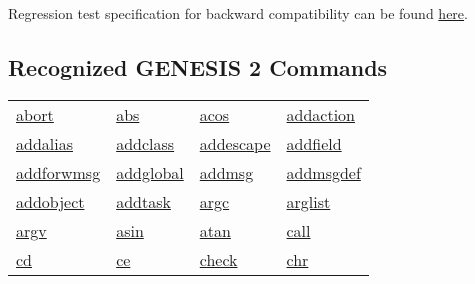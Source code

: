 \documentclass[12pt]{article}
\begin{document}
Regression test specification for backward compatibility can be found \href{http://neurospaces.sourceforge.net/neurospaces_project/ns-sli/tests/html/index.html}{here}.

\subsection*{Recognized GENESIS 2 Commands}

\begin{tabular}{l l l l}

\href{http://genesis-sim.org/GENESIS/Hyperdoc/Manual-25.html#ss25.1}{abort}                          & \href{http://genesis-sim.org/GENESIS/Hyperdoc/Manual-25.html#ss25.2}{abs}                        & \href{http://genesis-sim.org/GENESIS/Hyperdoc/Manual-25.html#ss25.3}{acos}              & \href{http://genesis-sim.org/GENESIS/Hyperdoc/Manual-25.html#ss25.4}{addaction}          \\
\href{http://genesis-sim.org/GENESIS/Hyperdoc/Manual-25.html#ss25.5}{addalias	}		& \href{http://genesis-sim.org/GENESIS/Hyperdoc/Manual-25.html#ss25.6}{addclass}		& \href{http://genesis-sim.org/GENESIS/Hyperdoc/Manual-25.html#ss25.7}{addescape}	& \href{http://genesis-sim.org/GENESIS/Hyperdoc/Manual-25.html#ss25.8}{addfield}		\\         
\href{http://genesis-sim.org/GENESIS/Hyperdoc/Manual-25.html#ss25.9}{addforwmsg}		& \href{http://genesis-sim.org/GENESIS/Hyperdoc/Manual-25.html#ss25.10}{addglobal}		& \href{http://genesis-sim.org/GENESIS/Hyperdoc/Manual-25.html#ss25.11}{addmsg} 	& \href{http://genesis-sim.org/GENESIS/Hyperdoc/Manual-25.html#ss25.12}{addmsgdef}	\\
\href{http://genesis-sim.org/GENESIS/Hyperdoc/Manual-25.html#ss25.13}{addobject}		& \href{http://genesis-sim.org/GENESIS/Hyperdoc/Manual-25.html#ss25.14}{addtask}		& \href{http://genesis-sim.org/GENESIS/Hyperdoc/Manual-25.html#ss25.15}{argc} 		& \href{http://genesis-sim.org/GENESIS/Hyperdoc/Manual-25.html#ss25.16}{arglist}		\\
\href{http://genesis-sim.org/GENESIS/Hyperdoc/Manual-25.html#ss25.17}{argv}			& \href{http://genesis-sim.org/GENESIS/Hyperdoc/Manual-25.html#ss25.19}{asin}			& \href{http://genesis-sim.org/GENESIS/Hyperdoc/Manual-25.html#ss25.20}{atan} 		& \href{http://genesis-sim.org/GENESIS/Hyperdoc/Manual-25.html#ss25.21}{call}			\\
\href{http://genesis-sim.org/GENESIS/Hyperdoc/Manual-25.html#ss25.23}{cd}				& \href{http://genesis-sim.org/GENESIS/Hyperdoc/Manual-25.html#ss25.24}{ce}			& \href{http://genesis-sim.org/GENESIS/Hyperdoc/Manual-25.html#ss25.26}{check} 	& \href{http://genesis-sim.org/GENESIS/Hyperdoc/Manual-25.html#ss25.27}{chr}			\\

\end{tabular}
\end{document}
